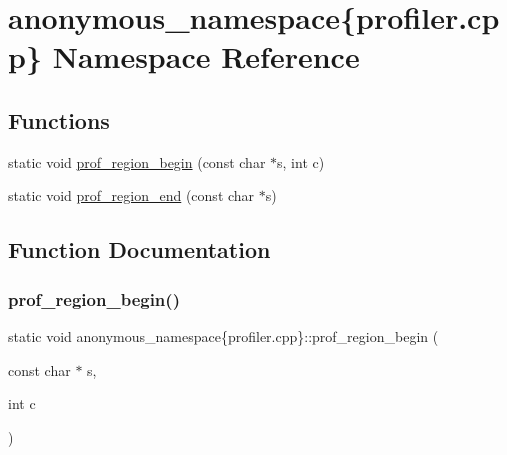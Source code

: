 \hypertarget{namespaceanonymous__namespace_02profiler_8cpp_03}{}\section{anonymous\+\_\+namespace\{profiler.\+cpp\} Namespace Reference}
\label{namespaceanonymous__namespace_02profiler_8cpp_03}
\subsection*{Functions}
\begin{DoxyCompactItemize}
\item 
static void \hyperlink{namespaceanonymous__namespace_02profiler_8cpp_03_ad2ea0278cd1f25dc30ddd76194ace64b}{prof\+\_\+region\+\_\+begin} (const char $\ast$s, int c)
\item 
static void \hyperlink{namespaceanonymous__namespace_02profiler_8cpp_03_a7984c26fb186307873a2f83f91715a99}{prof\+\_\+region\+\_\+end} (const char $\ast$s)
\end{DoxyCompactItemize}


\subsection{Function Documentation}
\mbox{\label{namespaceanonymous__namespace_02profiler_8cpp_03_ad2ea0278cd1f25dc30ddd76194ace64b}} 
\subsubsection{\texorpdfstring{prof\+\_\+region\+\_\+begin()}{prof\_region\_begin()}}
{\footnotesize\ttfamily static void anonymous\+\_\+namespace\{profiler.\+cpp\}\+::prof\+\_\+region\+\_\+begin (\begin{DoxyParamCaption}\item[{const char $\ast$}]{s,  }\item[{int}]{c }\end{DoxyParamCaption})\hspace{0.3cm}{\ttfamily [static]}}




